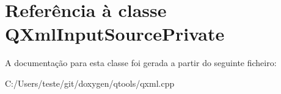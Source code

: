 \hypertarget{class_q_xml_input_source_private}{\section{Referência à classe Q\-Xml\-Input\-Source\-Private}
\label{class_q_xml_input_source_private}
}


A documentação para esta classe foi gerada a partir do seguinte ficheiro\-:\begin{DoxyCompactItemize}
\item 
C\-:/\-Users/teste/git/doxygen/qtools/qxml.\-cpp\end{DoxyCompactItemize}

